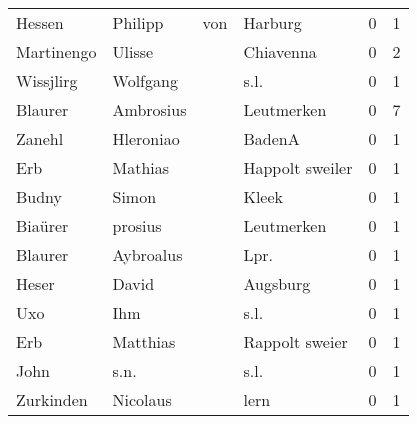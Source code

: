 \begin{tabular}{llllrr}
                   Hessen &                            Philipp &         von &                                     Harburg &          0 &         1 \\
               Martinengo &                             Ulisse &             &                                   Chiavenna &          0 &         2 \\
                Wissjlirg &                           Wolfgang &             &                                        s.l. &          0 &         1 \\
                  Blaurer &                          Ambrosius &             &                                  Leutmerken &          0 &         7 \\
                   Zanehl &                          Hleroniao &             &                                      BadenA &          0 &         1 \\
                      Erb &                            Mathias &             &                             Happolt sweiler &          0 &         1 \\
                    Budny &                              Simon &             &                                       Kleek &          0 &         1 \\
                  Biaürer &                            prosius &             &                                  Leutmerken &          0 &         1 \\
                  Blaurer &                          Aybroalus &             &                                       Lpr.  &          0 &         1 \\
                    Heser &                              David &             &                                    Augsburg &          0 &         1 \\
                      Uxo &                                Ihm &             &                                        s.l. &          0 &         1 \\
                      Erb &                           Matthias &             &                              Rappolt sweier &          0 &         1 \\
                     John &                               s.n. &             &                                        s.l. &          0 &         1 \\
                Zurkinden &                           Nicolaus &             &                                        lern &          0 &         1 \\

\end{tabular}
